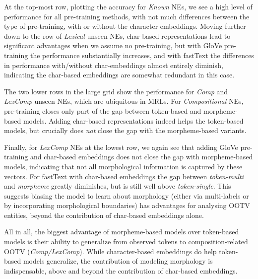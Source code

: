 \documentclass[11pt,a4paper]{article}
\newcommand{\TOKMACRO}{{\em token-single}\xspace}
\newcommand{\MULMACRO}{{\em token-multi}\xspace}
\newcommand{\MORMACRO}{{\em morpheme}\xspace}
\begin{document}
At the top-most row, plotting the accuracy for {\em Known} NEs, we see a high level of performance for all pre-training methods, with not much differences between the type of  pre-training, with or without the  character embeddings. Moving further down to the row of  {\em Lexical} unseen NEs, char-based representations lead to significant advantages when we assume no pre-training, but with GloVe pre-training the performance substantially increases, and with fastText the differences in performance with/without char-embeddings almost entirely diminish, indicating the char-based embeddings are somewhat redundant in this case.

The two lower rows in the large  grid show the performance for {\em Comp} and {\em LexComp} unseen NEs,   which are ubiquitous in MRLs. For {\em Compositional} NEs,  pre-training closes only part of the gap between token-based and morpheme-based models. Adding char-based representations indeed {helps} the token-based models, but crucially does {\em not} close the gap with the morpheme-based variants.   

Finally, for {\em LexComp} NEs at the lowest row, we again see that adding GloVe pre-training and char-based embeddings does not close the gap with morpheme-based models, indicating that not all morphological information is  captured by these vectors. For fastText with char-based embeddings the gap between \MULMACRO  and \MORMACRO greatly diminishes, but is still well above \TOKMACRO. This suggests 
 biasing the model to learn about morphology (either via multi-labels or by incorporating morphological boundaries) has advantages for analysing OOTV entities, beyond the contribution of char-based embeddings alone.  


All in all, the biggest advantage of
morpheme-based models over token-based models is their ability to generalize from observed tokens to composition-related OOTV ({\em Comp/LexComp}).
While character-based embeddings do help token-based models  generalize, the contribution of modeling morphology is indispensable, above and beyond the  contribution of char-based embeddings.  
\end{document}
